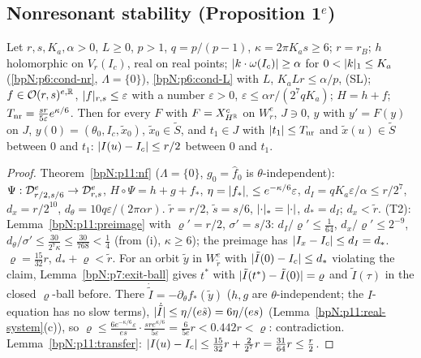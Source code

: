 \subsection{Nonresonant stability (Proposition 1$^e$)}\label{bpN:p11:s-nr}

\begin{proposition}\label{bpN:p11:nonresonant}
Let $r,s,K_a,\alpha>0$, $L\ge0$, $p>1$, $q=p/(p-1)$, $\kappa=2\pi K_as\ge6$; $r=r_B$; $h$ holomorphic on $V_r(I_c)$, real on real points; $\lvert k\cdot\omega(I_c)\rvert\ge\alpha$ for $0<\lvert k\rvert_1\le K_a$ (\ref{bpN:p6:cond-nr}, $\Lambda=\{0\}$), \ref{bpN:p6:cond-L} with $L$, $K_aLr\le\alpha/p$, (SL); $f\in\mathcal O(r,s)^{e,\mathbb{R}}$, $\lvert f\rvert_{r,s}\le\varepsilon$ with a number $\varepsilon>0$, $\varepsilon\le\alpha r/(2^7qK_a)$; $H=h+f$; $T_{\rm nr}=\frac{sr}{5\varepsilon}e^{\kappa/6}$. Then for every $F$ with $F=X^c_{H^{\mathbb{R}}}$ on $W^e_r$, $J\ni0$, $y$ with $y'=F(y)$ on $J$, $y(0)=(\theta_0,I_c,\tilde x_0)$, $\tilde x_0\in\tilde S$, and $t_1\in J$ with $\lvert t_1\rvert\le T_{\rm nr}$ and $\tilde x(u)\in\tilde S$ between $0$ and $t_1$: $\lvert I(u)-I_c\rvert\le r/2$ between $0$ and $t_1$.
\end{proposition}
\begin{proof}
\label{stepN:p11:nr-nf} Theorem~\ref{bpN:p11:nf} ($\Lambda=\{0\}$, $g_0=\hat f_0$ is $\theta$-independent): $\Psi:\mathcal D_{r/2,s/6}^e\to\mathcal D_{r,s}^e$, $H\circ\Psi=h+g+f_*$, $\eta=\lvert f_*\rvert_{,}\le e^{-\kappa/6}\varepsilon$, $d_I=qK_a\varepsilon/\alpha\le r/2^7$, $d_x=r/2^{10}$, $d_\theta=10q\varepsilon/(2\pi\alpha r)$.
\label{stepN:p11:nr-t12} $\tilde r=r/2$, $\tilde s=s/6$, $\lvert \cdot\rvert_*=\lvert \cdot\rvert$, $d_*=d_I$; $d_x<\tilde r$. (T2): Lemma~\ref{bpN:p11:preimage} with $\varrho'=r/2$, $\sigma'=s/3$: $d_I/\varrho'\le\frac1{64}$, $d_x/\varrho'\le2^{-9}$, $d_\theta/\sigma'\le\frac{30}{2^7\kappa}\le\frac{30}{768}<\frac14$ (from (i), $\kappa\ge6$); the preimage has $\lvert I_x-I_c\rvert\le d_I=d_*$.
\label{stepN:p11:nr-t3} $\varrho=\frac{15}{32}r$, $d_*+\varrho<\tilde r$. For an orbit $\tilde y$ in $W^e_{\tilde r}$ with $\lvert \tilde I(0)-I_c\rvert\le d_*$ violating the claim, Lemma~\ref{bpN:p7:exit-ball} gives $t^*$ with $\lvert \tilde I(t^*)-\tilde I(0)\rvert=\varrho$ and $\tilde I(\tau)$ in the closed $\varrho$-ball before. There $\dot{\tilde I}=-\partial_\theta f_*(\tilde y)$ ($h,g$ are $\theta$-independent; the $I$-equation has no slow terms), $\lvert \dot{\tilde I}\rvert\le\eta/(e\tilde s)=6\eta/(es)$ (Lemma~\ref{bpN:p11:real-system}(c)), so $\varrho\le\frac{6e^{-\kappa/6}\varepsilon}{es}\cdot\frac{sre^{\kappa/6}}{5\varepsilon}=\frac6{5e}r<0.442r<\varrho$: contradiction.
\label{stepN:p11:nr-concl} Lemma~\ref{bpN:p11:transfer}: $\lvert I(u)-I_c\rvert\le\frac{15}{32}r+\frac2{2^7}r=\frac{31}{64}r\le\frac r2$.
\end{proof}

